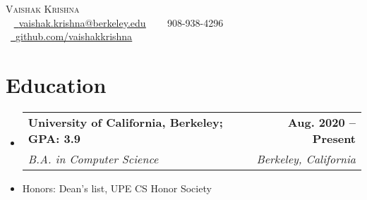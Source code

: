 \documentclass[letterpaper,11pt]{article}
\makeatletter
\newcommand{\resumeSubheading}[4]{
  \vspace{-2pt}\item
    \begin{tabular*}{1.0\textwidth}[t]{l@{\extracolsep{\fill}}r}
      \vspace{2pt}
      \textbf{\large #1} & \textbf{\small #2} \\ 
      \textit{\small#3} & \textit{\small #4} \\
    \end{tabular*}\vspace{-5pt}
}
\newcommand{\resumeSubHeadingListStart}{\begin{itemize}[leftmargin=0.0in, label={}]}
\newcommand{\resumeSubHeadingListEnd}{\end{itemize}}
\makeatother
\begin{document}

\begin{center}
    {\Huge \scshape Vaishak Krishna} \\ \vspace{6pt}
    ~ \small \href{mailto:vaishak.krishna@berkeley.edu}{\raisebox{-0.2\height}\faEnvelope\  \underline{vaishak.krishna@berkeley.edu}} ~
    ~\small \raisebox{-0.1\height}\faPhone\ 908-938-4296 ~
    ~\href{https://github.com/vaishakkrishna}{\raisebox{-0.2\height}\faGithub\ \underline{github.com/vaishakkrishna}}~
    \vspace{-8pt}
\end{center}


\section{Education}
  \resumeSubHeadingListStart
    \resumeSubheading
  {University of California, Berkeley; GPA: 3.9}{Aug. 2020 -- Present}
      {B.A. in Computer Science}{Berkeley, California}
    \vspace{-5pt}
      \item{Honors: Dean's list, UPE CS Honor Society}
      \vspace{-5pt}
  \resumeSubHeadingListEnd
  
\end{document}
